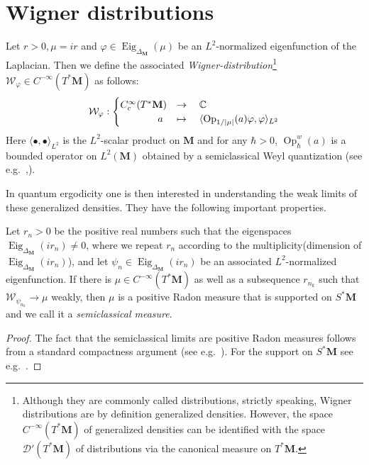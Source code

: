 \documentclass[AHL, Unicode, longabstracts, published]{cedram}
\DeclareMathOperator{\Eig}{Eig}
\DeclareMathOperator{\Op}{Op}
\newcommand{\cc}{\mathbb{C}}
\begin{document}
\appendix
\section{Wigner distributions}\label{app:wigner}
\begin{defi}\label{def:wigner}
Let $r>0, \mu=ir$ and $\varphi \in \Eig_{\Delta_{\mathbf M}} (\mu)$ be an $L^2$-normalized eigenfunction of the Laplacian. Then we define the associated \emph{Wigner-distribution}\footnote{Although they are commonly called distributions, strictly speaking, Wigner distributions are by definition generalized densities. However, the space $C^{-\infty}(T^*\mathbf M)$ of generalized densities can be identified with the space $\mathcal D'(T^*\mathbf M)$ of distributions via the canonical measure on $T^*\mathbf M$.} $\mathcal W_\varphi\in C^{-\infty}(T^*\mathbf M)$ as follows:
\[
\mathcal W_\varphi:
\begin{cases}
C_c^\infty (T^*\mathbf M) &\rightarrow\quad\cc\\
\mkern 68mu a &\mapsto \quad\langle \Op_{1/|\mu|} (a) \varphi, \varphi\rangle_{L^2}
\end{cases}
\]
Here $\langle\bullet,\bullet\rangle_{L^2}$ is the $L^2$-scalar product on $\mathbf M$ and for any $\hbar >0$, $\Op^w_\hbar (a)$ is a bounded operator on $L^2(\mathbf M)$ obtained by a semiclassical Weyl quantization (see e.g.~\cite{Zw12},\cite[Appendix~E]{DZ18}).
\end{defi}

In quantum ergodicity one is then interested in understanding the weak limits of these generalized densities. They have the following important properties.


\begin{prop}\label{prop:semiclassical_measures}
Let $r_n>0$ be the positive real numbers such that the eigenspaces $\Eig_{\Delta_{\mathbf M}} (ir_n)\neq 0$, where we repeat $r_n$ according to the multiplicity\linebreak (dimension of $\Eig_{\Delta_{\mathbf M}} (ir_n)$), and let $\psi_n\in \Eig_{\Delta_{\mathbf M}} (ir_n)$ be an associated $L^2$-normalized eigenfunction. If there is $\mu\in C^{-\infty}(T^*\mathbf M)$ as well as a subsequence $r_{n_k}$ such that $\mathcal W_{\psi_{n_k}}\to \mu$ weakly, then $\mu$ is a positive Radon measure that is supported on $S^*\mathbf M$ and we call it a
\emph{semiclassical measure}.
\end{prop}


\begin{proof}
The fact that the semiclassical limits are positive Radon measures follows from a standard compactness argument (see e.g.~\cite[Chapter~5]{Zw12}). For the support on $S^*\mathbf M$ see e.g.~\cite[Chapter~15]{Zw12}.
\end{proof}
\end{document}

